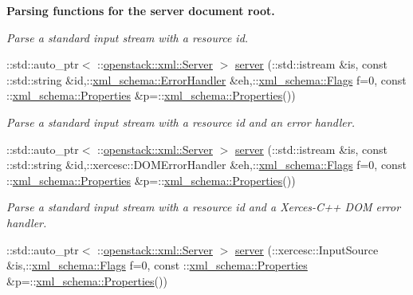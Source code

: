 \begin{Indent}{\bf Parsing functions for the server document root.}
\begin{DoxyCompactItemize}
\begin{DoxyCompactList}\small\item\em Parse a standard input stream with a resource id. \item\end{DoxyCompactList}\item 
::std::auto\_\-ptr$<$ ::\hyperlink{classopenstack_1_1xml_1_1Server}{openstack::xml::Server} $>$ \hyperlink{namespaceopenstack_1_1xml_a73f1da9668c3c96ebf65925d423b0e06}{server} (::std::istream \&is, const ::std::string \&id,::\hyperlink{namespacexml__schema_ab1c9361bfd3b404eaabf0c31eded79dc}{xml\_\-schema::ErrorHandler} \&eh,::\hyperlink{namespacexml__schema_affb4c227cbd9aa7453dd1dc5a1401943}{xml\_\-schema::Flags} f=0, const ::\hyperlink{namespacexml__schema_ad27ce19a7ee1d3b1064092648898f64c}{xml\_\-schema::Properties} \&p=::\hyperlink{namespacexml__schema_ad27ce19a7ee1d3b1064092648898f64c}{xml\_\-schema::Properties}())
\begin{DoxyCompactList}\small\item\em Parse a standard input stream with a resource id and an error handler. \item\end{DoxyCompactList}\item 
::std::auto\_\-ptr$<$ ::\hyperlink{classopenstack_1_1xml_1_1Server}{openstack::xml::Server} $>$ \hyperlink{namespaceopenstack_1_1xml_abbe186b0fd34c4aebb5d89116d7b9c8d}{server} (::std::istream \&is, const ::std::string \&id,::xercesc::DOMErrorHandler \&eh,::\hyperlink{namespacexml__schema_affb4c227cbd9aa7453dd1dc5a1401943}{xml\_\-schema::Flags} f=0, const ::\hyperlink{namespacexml__schema_ad27ce19a7ee1d3b1064092648898f64c}{xml\_\-schema::Properties} \&p=::\hyperlink{namespacexml__schema_ad27ce19a7ee1d3b1064092648898f64c}{xml\_\-schema::Properties}())
\begin{DoxyCompactList}\small\item\em Parse a standard input stream with a resource id and a Xerces-\/C++ DOM error handler. \item\end{DoxyCompactList}\item 
::std::auto\_\-ptr$<$ ::\hyperlink{classopenstack_1_1xml_1_1Server}{openstack::xml::Server} $>$ \hyperlink{namespaceopenstack_1_1xml_ac9175ed4bf48fe4c8bae7860f2d34e4a}{server} (::xercesc::InputSource \&is,::\hyperlink{namespacexml__schema_affb4c227cbd9aa7453dd1dc5a1401943}{xml\_\-schema::Flags} f=0, const ::\hyperlink{namespacexml__schema_ad27ce19a7ee1d3b1064092648898f64c}{xml\_\-schema::Properties} \&p=::\hyperlink{namespacexml__schema_ad27ce19a7ee1d3b1064092648898f64c}{xml\_\-schema::Properties}())

\end{DoxyCompactItemize}
\end{Indent}
